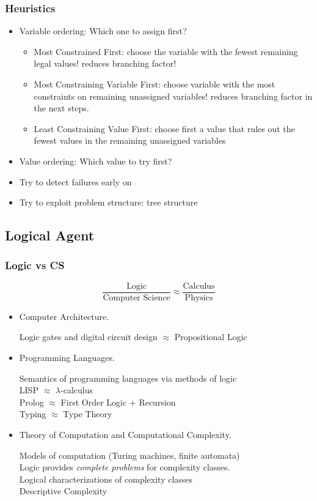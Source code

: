 \documentclass[UTF8,11pt,colorlinks,compress,openany]{beamer}%
\begin{document}
\begin{frame}\frametitle{Heuristics}
\begin{itemize}
	\item Variable ordering: Which one to assign first?
	\begin{itemize}
		\item Most Constrained First: choose the variable with the fewest remaining legal values! reduces branching factor!
		\item Most Constraining Variable First: choose variable with the most constraints on remaining unassigned variables! reduces branching factor in the next steps.
		\item Least Constraining Value First: choose first a value that rules out the fewest values in the remaining unassigned variables
	\end{itemize}
	\item Value ordering: Which value to try first?
	\item Try to detect failures early on
	\item Try to exploit problem structure: tree structure
\end{itemize}
\end{frame}

\subsection{Logical Agent}

\begin{frame}\frametitle{Logic vs CS}
\[\dfrac{\text{Logic}}{\text{Computer Science}} \approx \dfrac{\text{Calculus}}{\text{Physics}}\]
	\begin{itemize}
		\item Computer Architecture.
		
		Logic gates and digital circuit design $\approx$ Propositional Logic
		\item Programming Languages.
		
		Semantics of programming languages via methods of logic\\
		LISP $\approx$ $\lambda$-calculus\\
		Prolog $\approx$ First Order Logic $+$ Recursion\\
		Typing $\approx$ Type Theory
		\item Theory of Computation and Computational Complexity.
		
		Models of computation (Turing machines, finite automata)\\
		Logic provides \emph{complete problems} for complexity classes.\\
		Logical characterizations of complexity classes\\
		Descriptive Complexity
	\end{itemize}
\end{frame}
\end{document}
